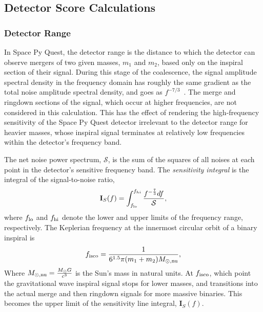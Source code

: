 \documentclass{article}
\begin{document}
\subsection{Detector Score Calculations}
\subsubsection*{Detector Range}
In Space Py Quest, the detector range is the distance to which the
detector can observe mergers of two given masses, $m_1$ and $m_2$,
based only on the inspiral section of their signal. During this stage
of the coalescence, the signal amplitude spectral density in the
frequency domain has roughly the same gradient as the total noise
amplitude spectral density, and goes as $f^{-7/3}$~\cite{ajith}. The
merge and ringdown sections of the signal, which occur at higher
frequencies, are not considered in this calculation. This has the
effect of rendering the high-frequency sensitivity of the Space Py
Quest detector irrelevant to the detector range for heavier masses,
whose inspiral signal terminates at relatively low frequencies within
the detector's frequency band.

The net noise power spectrum, $\mathcal{S}$, is the sum of the squares
of all noises at each point in the detector's sensitive frequency
band.
    The \textit{sensitivity integral} is the integral of the signal-to-noise ratio,
    \begin{equation}
    \mathbf{I}_S(f) = \int_{f_{\rm lo}}^{f_{hi}} \frac{f^{-\frac{7}{3}}df}{\mathcal{S}},
    \end{equation}
    where $f_{\rm  lo}$ and $f_{\rm  hi}$ denote the lower and upper limits of the frequency range, respectively.
    The Keplerian frequency at the innermost circular orbit of a binary inspiral is
    \begin{equation}
    \label{eq:isco}
    f_{\rm isco} = \frac{1}{6^{1.5}\pi(m_1+m_2)M_{\rm \odot,nu}},
    \end{equation}
    Where $M_{\rm \odot,nu} = \frac{M_{\rm \odot}G}{c^3}$ is the Sun's mass in
    natural units. At $f_{\rm isco}$, which point the gravitational wave
    inspiral signal stops for lower masses, and transitions into the
    actual merge and then ringdown signals for more massive
    binaries. This becomes the upper limit of the sensitivity line
    integral, $\mathbf{I}_S(f)$.
\end{document}
